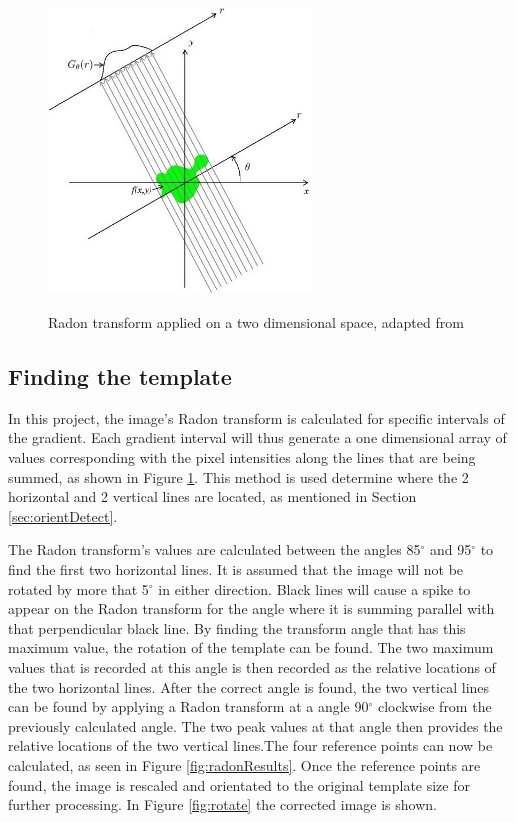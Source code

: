 \begin{figure}
  \centering
  \includegraphics[width=7cm]{RadonT}\\
  \caption{Radon transform applied on a two dimensional space, adapted from \citet{radon}}
  \label{fig:RadonT}
\end{figure}

\subsection{Finding the template}
\label{sec:findTemplate}

In this project, the image's Radon transform is calculated for specific intervals of the gradient. Each gradient interval will thus generate a one dimensional array of values corresponding with the pixel intensities along the lines that are being summed, as shown in Figure \ref{fig:RadonT}. This method is used determine where the 2 horizontal and 2 vertical lines are located, as mentioned in Section \ref{sec:orientDetect}. 

The Radon transform's values are calculated between the angles 85$^{\circ}$ and 95$^{\circ}$ to find the first two horizontal lines. It is assumed that the image will not be rotated by more that 5$^{\circ}$ in either direction. Black lines will cause a spike to appear on the Radon transform for the angle where it is summing parallel with that perpendicular black line. By finding the transform angle that has this maximum value, the rotation of the template can be found. The two maximum values that is recorded at this angle is then recorded as the relative locations of the two horizontal lines. After the correct angle is found, the two vertical lines can be found by applying a Radon transform at a angle 90$^{\circ}$ clockwise from the previously calculated angle. The two peak values at that angle then provides the relative locations of the two vertical lines.The four reference points can now be calculated, as seen in Figure \ref{fig:radonResults}. Once the reference points are found, the image is rescaled and orientated to the original template size for further processing. In Figure \ref{fig:rotate} the corrected image is shown.


